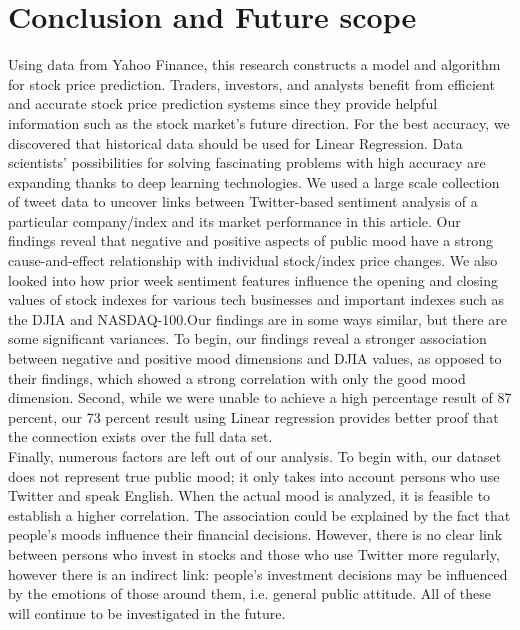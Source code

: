 \chapter{Conclusion and Future scope}
Using data from Yahoo Finance, this research constructs a model and algorithm for stock price prediction. Traders, investors, and analysts benefit from efficient and accurate stock price prediction systems since they provide helpful information such as the stock market's future direction. For the best accuracy, we discovered that historical data should be used for Linear Regression. Data scientists' possibilities for solving fascinating problems with high accuracy are expanding thanks to deep learning technologies. We used a large scale collection of tweet data to uncover links between Twitter-based sentiment analysis of a particular company/index and its market performance in this article. Our findings reveal that negative and positive aspects of public mood have a strong cause-and-effect relationship with individual stock/index price changes. We also looked into how prior week sentiment features influence the opening and closing values of stock indexes for various tech businesses and important indexes such as the DJIA and NASDAQ-100.Our findings are in some ways similar, but there are some significant variances. To begin, our findings reveal a stronger association between negative and positive mood dimensions and DJIA values, as opposed to their findings, which showed a strong correlation with only the good mood dimension. Second, while we were unable to achieve a high percentage result of 87 percent, our 73 percent result using Linear regression provides better proof that the connection exists over the full data set.\\



Finally, numerous factors are left out of our analysis. To begin with, our dataset does not represent true public mood; it only takes into account persons who use Twitter and speak English. When the actual mood is analyzed, it is feasible to establish a higher correlation. The association could be explained by the fact that people's moods influence their financial decisions. However, there is no clear link between persons who invest in stocks and those who use Twitter more regularly, however there is an indirect link: people's investment decisions may be influenced by the emotions of those around them, i.e. general public attitude. All of these will continue to be investigated in the future.\\